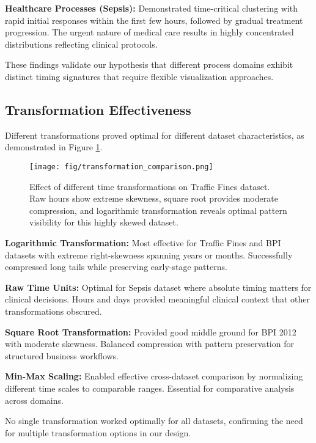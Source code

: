 \textbf{Healthcare Processes (Sepsis):} Demonstrated time-critical clustering with rapid initial responses within the first few hours, followed by gradual treatment progression. The urgent nature of medical care results in highly concentrated distributions reflecting clinical protocols.

These findings validate our hypothesis that different process domains exhibit distinct timing signatures that require flexible visualization approaches.

\subsection{Transformation Effectiveness}
\label{subsec:transformation_results}

Different transformations proved optimal for different dataset characteristics, as demonstrated in Figure \ref{fig:transformation_comparison}.

\begin{figure}[H]
\centering
\texttt{[image: fig/transformation\_comparison.png]}
\caption{Effect of different time transformations on Traffic Fines dataset. Raw hours show extreme skewness, square root provides moderate compression, and logarithmic transformation reveals optimal pattern visibility for this highly skewed dataset.}
\label{fig:transformation_comparison}
\end{figure}

\textbf{Logarithmic Transformation:} Most effective for Traffic Fines and BPI datasets with extreme right-skewness spanning years or months. Successfully compressed long tails while preserving early-stage patterns.

\textbf{Raw Time Units:} Optimal for Sepsis dataset where absolute timing matters for clinical decisions. Hours and days provided meaningful clinical context that other transformations obscured.

\textbf{Square Root Transformation:} Provided good middle ground for BPI 2012 with moderate skewness. Balanced compression with pattern preservation for structured business workflows.

\textbf{Min-Max Scaling:} Enabled effective cross-dataset comparison by normalizing different time scales to comparable ranges. Essential for comparative analysis across domains.

No single transformation worked optimally for all datasets, confirming the need for multiple transformation options in our design.


